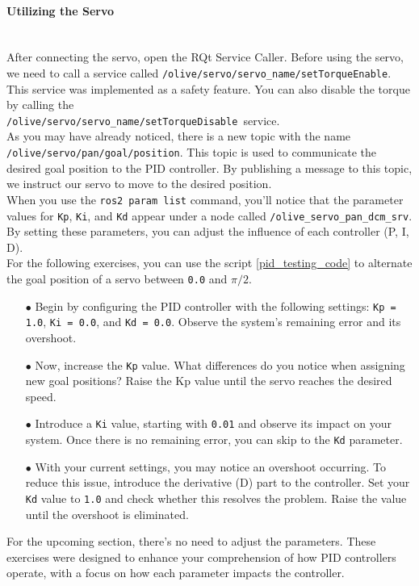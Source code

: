 \documentclass{article}
\begin{document}
\paragraph{Utilizing the Servo}~\\
After connecting the servo, open the RQt Service Caller. Before using the servo, we need to call a service called \texttt{/olive/servo/servo\_name/setTorqueEnable}. This service was implemented as a safety feature. You can also disable the torque by calling the\\
\texttt{/olive/servo/servo\_name/setTorqueDisable }service.\\
As you may have already noticed, there is a new topic with the name \texttt{/olive/servo/pan/goal/position}. This topic is used to communicate the desired goal position to the PID controller. By publishing a message to this topic, we instruct our servo to move to the desired position.\\
When you use the \texttt{ros2 param list} command, you'll notice that the parameter values for \texttt{Kp}, \texttt{Ki}, and \texttt{Kd} appear under a node called \texttt{/olive\_servo\_pan\_dcm\_srv}. By setting these parameters, you can adjust the influence of each controller (P, I, D).\\
For the following exercises, you can use the script \ref{pid_testing_code} to alternate the goal position of a servo between \texttt{0.0} and \texttt{$\pi / 2$}.
\begin{enumerate}
    \item[$\bullet$]Begin by configuring the PID controller with the following settings: \texttt{Kp = 1.0}, \texttt{Ki = 0.0}, and \texttt{Kd = 0.0}. Observe the system's remaining error and its overshoot.
    \item[$\bullet$] Now, increase the \texttt{Kp} value. What differences do you notice when assigning new goal positions? Raise the Kp value until the servo reaches the desired speed.
    \item[$\bullet$] Introduce a \texttt{Ki} value, starting with \texttt{0.01} and observe its impact on your system. Once there is no remaining error, you can skip to the \texttt{Kd} parameter.
    \item[$\bullet$] With your current settings, you may notice an overshoot occurring. To reduce this issue, introduce the derivative (D) part to the controller. Set your \texttt{Kd} value to \texttt{1.0} and check whether this resolves the problem. Raise the value until the overshoot is eliminated.
\end{enumerate}
For the upcoming section, there's no need to adjust the parameters. These exercises were designed to enhance your comprehension of how PID controllers operate, with a focus on how each parameter impacts the controller.
\end{document}
